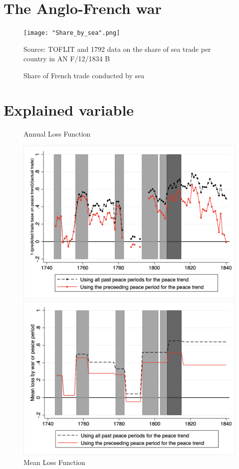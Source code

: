 \documentclass[12pt,a4paper,notitlepage,english]{article}
\newcommand{\source}[1]{\caption*{\footnotesize Source: {#1}} }
\begin{document}
\begin{appendix}
\section{The Anglo-French war}
\begin{figure}[h!]
	\caption{Share of French trade conducted by sea}
	\centering
	\texttt{[image: "Share\_by\_sea".png]}
	\source{TOFLIT and 1792 data on the share of sea trade per country in AN F/12/1834 B}
	\label{Share_by_sea}
\end{figure}


\section{Explained variable}

\begin{center}
\begin{figure}[h!]
\caption{Annual Loss Function}
\label{annual_loss_function}
\centering
\includegraphics[scale=0.5]{Annual_loss_function}
\caption{Mean Loss Function}
\label{mean_loss_function}
\includegraphics[scale=0.5]{Mean_loss_function}
\end{figure}
\end{center}


\end{appendix}
\end{document}
